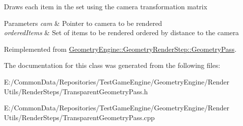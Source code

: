 Draws each item in the set using the camera transformation matrix 
\begin{DoxyParams}{Parameters}
{\em cam} & Pointer to camera to be rendered \\
\hline
{\em ordered\+Items} & Set of items to be rendered ordered by distance to the camera \\
\hline
\end{DoxyParams}


Reimplemented from \mbox{\hyperlink{class_geometry_engine_1_1_geometry_render_step_1_1_geometry_pass_ac84ca025bf90afc42acade7b15b40cf2}{Geometry\+Engine\+::\+Geometry\+Render\+Step\+::\+Geometry\+Pass}}.



The documentation for this class was generated from the following files\+:\begin{DoxyCompactItemize}
\item 
E\+:/\+Common\+Data/\+Repositories/\+Test\+Game\+Engine/\+Geometry\+Engine/\+Render Utils/\+Render\+Steps/Transparent\+Geometry\+Pass.\+h\item 
E\+:/\+Common\+Data/\+Repositories/\+Test\+Game\+Engine/\+Geometry\+Engine/\+Render Utils/\+Render\+Steps/Transparent\+Geometry\+Pass.\+cpp\end{DoxyCompactItemize}

